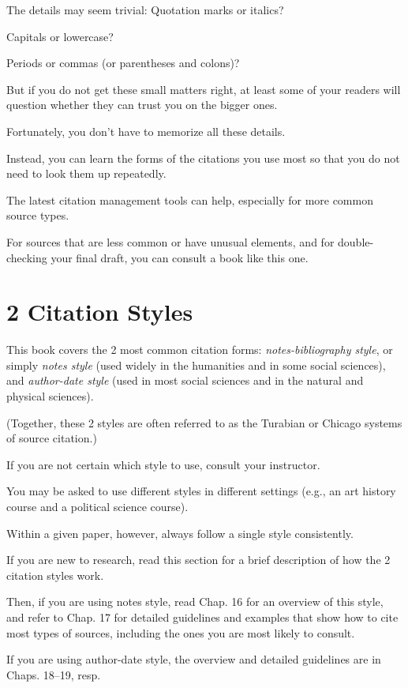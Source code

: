 \documentclass[oneside]{book}
\numberwithin{equation}{section}
\begin{document}
The details may seem trivial: Quotation marks or italics?

Capitals or lowercase?

Periods or commas (or parentheses and colons)?

But if you do not get these small matters right, at least some of your readers will question whether they can trust you on the bigger ones.

Fortunately, you don't have to memorize all these details.

Instead, you can learn the forms of the citations you use most so that you do not need to look them up repeatedly.

The latest citation management tools can help, especially for more common source types.

For sources that are less common or have unusual elements, and for double-checking your final draft, you can consult a book like this one.

\section{2 Citation Styles}
This book covers the 2 most common citation forms: \textit{notes-bibliography style}, or simply \textit{notes style} (used widely in the humanities and in some social sciences), and \textit{author-date style} (used in most social sciences and in the natural and physical sciences).

(Together, these 2 styles are often referred to as the Turabian or Chicago systems of source citation.)

If you are not certain which style to use, consult your instructor.

%
You may be asked to use different styles in different settings (e.g., an art history course and a political science course).

Within a given paper, however, always follow a single style consistently.

%
If you are new to research, read this section for a brief description of how the 2 citation styles work.

Then, if you are using notes style, read Chap. 16 for an overview of this style, and refer to Chap. 17 for detailed guidelines and examples that show how to cite most types of sources, including the ones you are most likely to consult.

If you are using author-date style, the overview and detailed guidelines are in Chaps. 18--19, resp.
\end{document}

